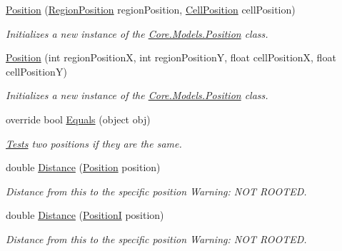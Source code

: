 \begin{DoxyCompactItemize}
\hyperlink{classCore_1_1Models_1_1Position_a71cb4b1cddaf9ee97c7786089b2918ba}{Position} (\hyperlink{classCore_1_1Models_1_1RegionPosition}{Region\+Position} region\+Position, \hyperlink{classCore_1_1Models_1_1CellPosition}{Cell\+Position} cell\+Position)
\begin{DoxyCompactList}\small\item\em Initializes a new instance of the \hyperlink{classCore_1_1Models_1_1Position}{Core.\+Models.\+Position} class. \end{DoxyCompactList}\item 
\hyperlink{classCore_1_1Models_1_1Position_a7170355b2965f3a38403fc2e284b99b2}{Position} (int region\+Position\+X, int region\+Position\+Y, float cell\+Position\+X, float cell\+Position\+Y)
\begin{DoxyCompactList}\small\item\em Initializes a new instance of the \hyperlink{classCore_1_1Models_1_1Position}{Core.\+Models.\+Position} class. \end{DoxyCompactList}\item 
override bool \hyperlink{classCore_1_1Models_1_1Position_a1567fd4c36196e790e898fd510103d32}{Equals} (object obj)
\begin{DoxyCompactList}\small\item\em \hyperlink{namespaceTests}{Tests} two positions if they are the same. \end{DoxyCompactList}\item 
double \hyperlink{classCore_1_1Models_1_1Position_a705ea8b8d29426c30419c70d86d84921}{Distance} (\hyperlink{classCore_1_1Models_1_1Position}{Position} position)
\begin{DoxyCompactList}\small\item\em Distance from this to the specific position Warning\+: N\+O\+T R\+O\+O\+T\+E\+D. \end{DoxyCompactList}\item 
double \hyperlink{classCore_1_1Models_1_1Position_ac5995b654052669d462d54957b04e271}{Distance} (\hyperlink{classCore_1_1Models_1_1PositionI}{Position\+I} position)
\begin{DoxyCompactList}\small\item\em Distance from this to the specific position Warning\+: N\+O\+T R\+O\+O\+T\+E\+D. \end{DoxyCompactList}\end{DoxyCompactItemize}
